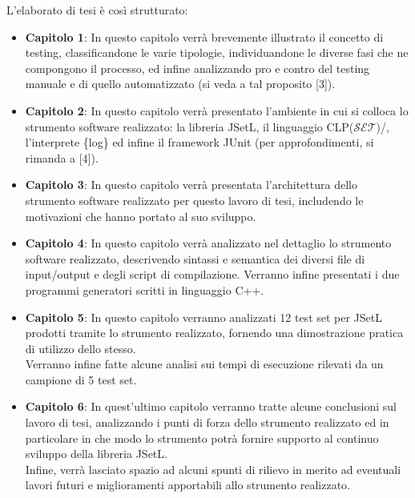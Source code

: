 L'elaborato di tesi è così strutturato:
\begin{itemize}
    \item \textbf{Capitolo 1}: In questo capitolo verrà brevemente illustrato il concetto di testing, classificandone le varie tipologie, individuandone le diverse fasi che ne compongono il processo, ed infine analizzando pro e contro del testing manuale e di quello automatizzato (si veda a tal proposito [3]).
    
    \item \textbf{Capitolo 2}: In questo capitolo verrà presentato l'ambiente in cui si colloca lo strumento software realizzato: la libreria JSetL, il linguaggio CLP(\(\mathcal{SET}\))/, l'interprete \{log\} ed infine il framework JUnit (per approfondimenti, si rimanda a [4]).
    
    \item \textbf{Capitolo 3}: In questo capitolo verrà presentata l'architettura dello strumento software realizzato per questo lavoro di tesi, includendo le motivazioni che hanno portato al suo sviluppo.

    \item \textbf{Capitolo 4}: In questo capitolo verrà analizzato nel dettaglio lo strumento software realizzato, descrivendo sintassi e semantica dei diversi file di input/output e degli script di compilazione. Verranno infine presentati i due programmi generatori scritti in linguaggio C++.
    
    \item \textbf{Capitolo 5}: In questo capitolo verranno analizzati 12 test set per JSetL prodotti tramite lo strumento realizzato, fornendo una dimostrazione pratica di utilizzo dello stesso.\\
    Verranno infine fatte alcune analisi sui tempi di esecuzione rilevati da un campione di 5 test set.
    
\item \textbf{Capitolo 6}: In quest'ultimo capitolo verranno tratte alcune conclusioni sul lavoro di tesi, analizzando i punti di forza dello strumento realizzato ed in particolare in che modo lo strumento potrà fornire supporto al continuo sviluppo della libreria JSetL.\\
Infine, verrà lasciato spazio ad alcuni spunti di rilievo in merito ad eventuali lavori futuri e miglioramenti apportabili allo strumento realizzato.

\end{itemize}


